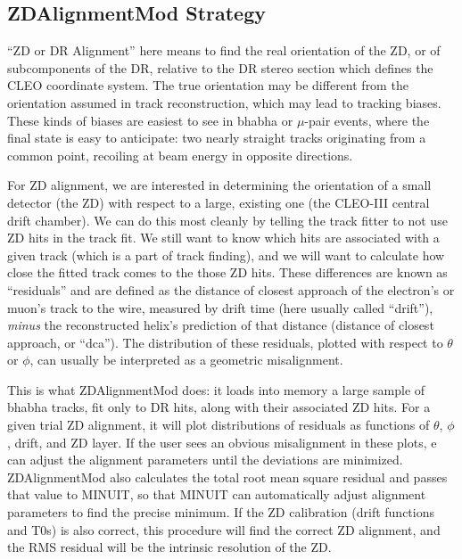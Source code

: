 \documentclass[12pt]{article}
\begin{document}
\subsection{ZDAlignmentMod Strategy}
\label{ZDAlignmentMod_Strategy}

``ZD or DR Alignment'' here means to find the real orientation of the
ZD, or of subcomponents of the DR, relative to the DR stereo section
which defines the CLEO coordinate system.  The true orientation may be
different from the orientation assumed in track reconstruction, which
may lead to tracking biases.  These kinds of biases are easiest to see
in bhabha or $\mu$-pair events, where the final state is easy to
anticipate: two nearly straight tracks originating from a common
point, recoiling at beam energy in opposite directions.

For ZD alignment, we are interested in determining the orientation of
a small detector (the ZD) with respect to a large, existing one (the
CLEO-III central drift chamber).  We can do this most cleanly by
telling the track fitter to not use ZD hits in the track fit.  We
still want to know which hits are associated with a given track (which
is a part of track finding), and we will want to calculate how close
the fitted track comes to the those ZD hits.  These differences are
known as ``residuals'' and are defined as the distance of closest
approach of the electron's or muon's track to the wire, measured by
drift time (here usually called ``drift''), {\it minus} the
reconstructed helix's prediction of that distance (distance of closest
approach, or ``dca'').  The distribution of these residuals, plotted
with respect to $\theta$ or $\phi$, can usually be interpreted as a
geometric misalignment.

This is what ZDAlignmentMod does: it loads into memory a large sample
of bhabha tracks, fit only to DR hits, along with their associated ZD
hits.  For a given trial ZD alignment, it will plot distributions of
residuals as functions of $\theta$, $\phi$, drift, and ZD layer.  If
the user sees an obvious misalignment in these plots, e can adjust the
alignment parameters until the deviations are minimized.
ZDAlignmentMod also calculates the total root mean square residual and
passes that value to MINUIT, so that MINUIT can automatically adjust
alignment parameters to find the precise minimum.  If the ZD
calibration (drift functions and T0s) is also correct, this procedure
will find the correct ZD alignment, and the RMS residual will be the
intrinsic resolution of the ZD.
\end{document}
